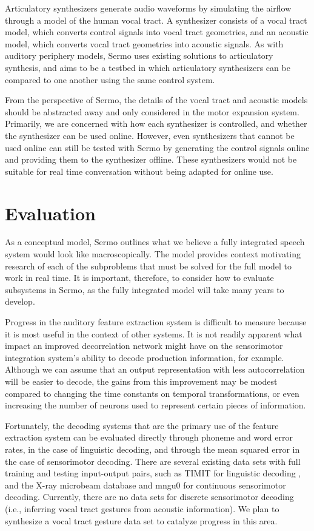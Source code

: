 Articulatory synthesizers
generate audio waveforms
by simulating the airflow
through a model of the human vocal tract.
A synthesizer consists of a vocal tract model,
which converts control signals
into vocal tract geometries,
and an acoustic model,
which converts vocal tract geometries
into acoustic signals.
As with auditory periphery models,
Sermo uses existing solutions
to articulatory synthesis,
and aims to be a testbed
in which articulatory synthesizers
can be compared to one another
using the same control system.

From the perspective of Sermo,
the details of the vocal tract
and acoustic models
should be abstracted away
and only considered
in the motor expansion system.
Primarily, we are concerned with
how each synthesizer is controlled,
and whether the synthesizer
can be used online.
However, even synthesizers
that cannot be used online
can still be tested with Sermo
by generating the control signals online
and providing them to the synthesizer offline.
These synthesizers would not be suitable
for real time conversation without
being adapted for online use.

\section{Evaluation}

As a conceptual model,
Sermo outlines what we believe a fully integrated
speech system would look like macroscopically.
The model provides context
motivating research of each
of the subproblems that must be solved
for the full model to work in real time.
It is important, therefore,
to consider how to evaluate
subsystems in Sermo,
as the fully integrated model
will take many years to develop.

Progress in the auditory feature extraction system
is difficult to measure
because it is most useful
in the context of other systems.
It is not readily apparent
what impact
an improved decorrelation network
might have on the sensorimotor integration
system's ability to decode production information,
for example.
Although we can assume that
an output representation with
less autocorrelation
will be easier to decode,
the gains from this improvement
may be modest compared to
changing the time constants on temporal transformations,
or even increasing the number of neurons
used to represent certain pieces of information.

Fortunately, the decoding systems
that are the primary use
of the feature extraction system
can be evaluated directly
through phoneme and word error rates,
in the case of linguistic decoding,
and through the mean squared error
in the case of sensorimotor decoding.
There are several existing data sets
with full training and testing
input-output pairs,
such as TIMIT for linguistic decoding
\citep{garofolo1993},
and the X-ray microbeam database \citep{westbury1990}
and mngu0 \citep{steiner2012}
for continuous sensorimotor decoding.
Currently, there are no data sets
for discrete sensorimotor decoding
(i.e., inferring vocal tract gestures
from acoustic information).
We plan to synthesize a
vocal tract gesture
data set to catalyze progress
in this area.


